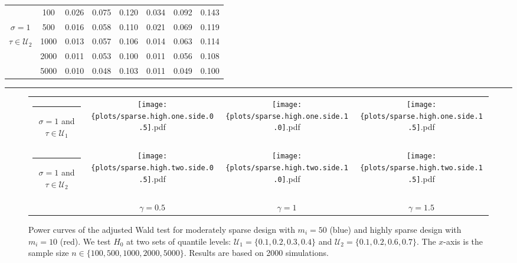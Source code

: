 \documentclass[times,sort&compress,3p]{elsarticle}
\theoremstyle{plain}%
\theoremstyle{definition}
\begin{document}
\begin{table}
\begin{tabular}{cccccccc}
&   100 & 0.026  & 0.075  & 0.120  & 0.034  & 0.092  & 0.143  \\ 
$\sigma = 1$ &  500 & 0.016  & 0.058  & 0.110  & 0.021  & 0.069  & 0.119  \\ 
$ \tau \in \mathcal{U}_2$ &   1000 & 0.013  & 0.057  & 0.106  & 0.014  & 0.063  & 0.114  \\ 
&  2000 & 0.011  & 0.053  & 0.100  & 0.011  & 0.056  & 0.108  \\ 
&  5000 & 0.010  & 0.048  & 0.103  & 0.011  & 0.049  & 0.100  \\ 
\end{tabular}
\hrule 
\end{table} 

\begin{figure}[h!]
\begin{tabular}{cccc}
\begin{sideways} \rule[0pt]{0.4in}{0pt} $\sigma = 1$ and $\tau \in \mathcal{U}_1$ \end{sideways}
& \texttt{[image: \{plots/sparse.high.one.side.0.5]}.pdf}
& \texttt{[image: \{plots/sparse.high.one.side.1.0]}.pdf}
& \texttt{[image: \{plots/sparse.high.one.side.1.5]}.pdf} \\
\begin{sideways} \rule[0pt]{0.4in}{0pt} $\sigma = 1$ and $\tau \in \mathcal{U}_2$ \end{sideways}
& \texttt{[image: \{plots/sparse.high.two.side.0.5]}.pdf}
& \texttt{[image: \{plots/sparse.high.two.side.1.0]}.pdf}
& \texttt{[image: \{plots/sparse.high.two.side.1.5]}.pdf} \\
& $\gamma = 0.5$ & $\gamma = 1$ & $\gamma = 1.5$ 
\end{tabular} 
\caption{Power curves of the adjusted Wald test for moderately sparse design with $m_i = 50$ (blue) and highly sparse design with $m_i = 10$ (red). We test $H_0$ at two sets of quantile levels: $\mathcal{U}_1 = \{0.1, 0.2, 0.3, 0.4\}$ and $\mathcal{U}_2 = \{0.1, 0.2, 0.6, 0.7\}$. The $x$-axis is the sample size $n \in \{100, 500, 1000, 2000, 5000\}$. Results are based on 2000 simulations.} 
\label{figure:power.sparse}
\end{figure}
\end{document}
